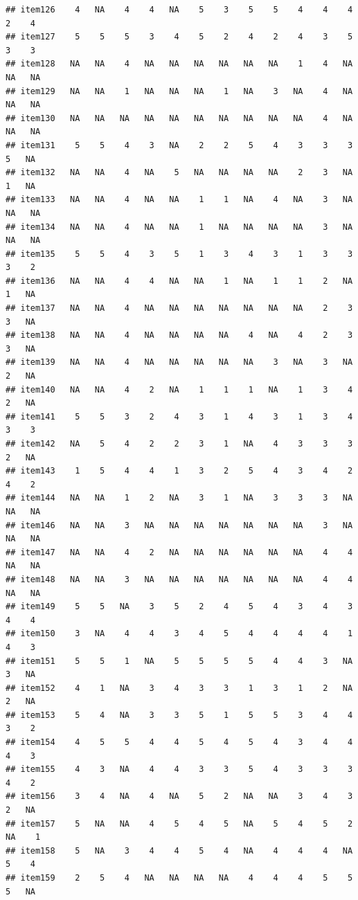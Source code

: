 \documentclass[
  man]{apa6}
\begin{document}
\begin{verbatim}
## item126    4   NA    4    4   NA    5    3    5    5    4    4    4    2    4
## item127    5    5    5    3    4    5    2    4    2    4    3    5    3    3
## item128   NA   NA    4   NA   NA   NA   NA   NA   NA    1    4   NA   NA   NA
## item129   NA   NA    1   NA   NA   NA    1   NA    3   NA    4   NA   NA   NA
## item130   NA   NA   NA   NA   NA   NA   NA   NA   NA   NA    4   NA   NA   NA
## item131    5    5    4    3   NA    2    2    5    4    3    3    3    5   NA
## item132   NA   NA    4   NA    5   NA   NA   NA   NA    2    3   NA    1   NA
## item133   NA   NA    4   NA   NA    1    1   NA    4   NA    3   NA   NA   NA
## item134   NA   NA    4   NA   NA    1   NA   NA   NA   NA    3   NA   NA   NA
## item135    5    5    4    3    5    1    3    4    3    1    3    3    3    2
## item136   NA   NA    4    4   NA   NA    1   NA    1    1    2   NA    1   NA
## item137   NA   NA    4   NA   NA   NA   NA   NA   NA   NA    2    3    3   NA
## item138   NA   NA    4   NA   NA   NA   NA    4   NA    4    2    3    3   NA
## item139   NA   NA    4   NA   NA   NA   NA   NA    3   NA    3   NA    2   NA
## item140   NA   NA    4    2   NA    1    1    1   NA    1    3    4    2   NA
## item141    5    5    3    2    4    3    1    4    3    1    3    4    3    3
## item142   NA    5    4    2    2    3    1   NA    4    3    3    3    2   NA
## item143    1    5    4    4    1    3    2    5    4    3    4    2    4    2
## item144   NA   NA    1    2   NA    3    1   NA    3    3    3   NA   NA   NA
## item146   NA   NA    3   NA   NA   NA   NA   NA   NA   NA    3   NA   NA   NA
## item147   NA   NA    4    2   NA   NA   NA   NA   NA   NA    4    4   NA   NA
## item148   NA   NA    3   NA   NA   NA   NA   NA   NA   NA    4    4   NA   NA
## item149    5    5   NA    3    5    2    4    5    4    3    4    3    4    4
## item150    3   NA    4    4    3    4    5    4    4    4    4    1    4    3
## item151    5    5    1   NA    5    5    5    5    4    4    3   NA    3   NA
## item152    4    1   NA    3    4    3    3    1    3    1    2   NA    2   NA
## item153    5    4   NA    3    3    5    1    5    5    3    4    4    3    2
## item154    4    5    5    4    4    5    4    5    4    3    4    4    4    3
## item155    4    3   NA    4    4    3    3    5    4    3    3    3    4    2
## item156    3    4   NA    4   NA    5    2   NA   NA    3    4    3    2   NA
## item157    5   NA   NA    4    5    4    5   NA    5    4    5    2   NA    1
## item158    5   NA    3    4    4    5    4   NA    4    4    4   NA    5    4
## item159    2    5    4   NA   NA   NA   NA    4    4    4    5    5    5   NA

\end{verbatim}
\end{document}
